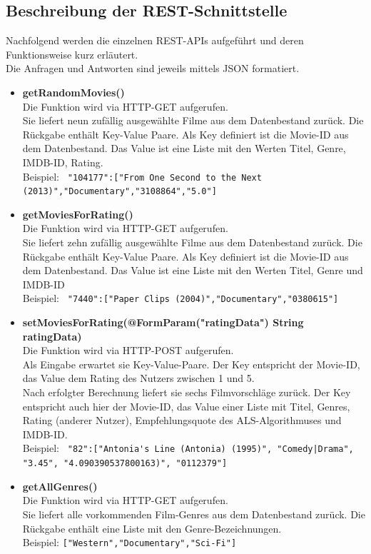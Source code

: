 \subsection{Beschreibung der REST-Schnittstelle}
Nachfolgend werden die einzelnen REST-APIs aufgeführt und deren Funktionsweise kurz erläutert.\\
Die Anfragen und Antworten sind jeweils mittels JSON formatiert.
\begin{itemize}
  \item \textbf{getRandomMovies()}\\
  	Die Funktion wird via HTTP-GET aufgerufen.\\
  	Sie liefert neun zufällig ausgewählte Filme aus dem Datenbestand zurück. Die Rückgabe enthält Key-Value Paare. Als Key definiert ist die Movie-ID aus dem Datenbestand. Das Value ist eine Liste mit den Werten Titel, Genre, IMDB-ID, Rating.\\
  	Beispiel: \lstinline{ "104177":["From One Second to the Next (2013)","Documentary","3108864","5.0"]}\\
  \item \textbf{getMoviesForRating()}\\
 	Die Funktion wird via HTTP-GET aufgerufen.\\
	Sie liefert zehn zufällig ausgewählte Filme aus dem Datenbestand zurück. Die Rückgabe enthält Key-Value Paare. Als Key definiert ist die Movie-ID aus dem Datenbestand. Das Value ist eine Liste mit den Werten Titel, Genre und IMDB-ID\\
  	Beispiel: \lstinline{ "7440":["Paper Clips (2004)","Documentary","0380615"]}\\
  \item \textbf{setMoviesForRating(@FormParam("ratingData") String ratingData)}\\
  	Die Funktion wird via HTTP-POST aufgerufen.\\
  	Als Eingabe erwartet sie Key-Value-Paare. Der Key entspricht der Movie-ID, das Value dem Rating des Nutzers zwischen 1 und 5.\\
  	Nach erfolgter Berechnung liefert sie sechs Filmvorschläge zurück. Der Key entspricht auch hier der Movie-ID, das Value einer Liste mit Titel, Genres, Rating (anderer Nutzer), Empfehlungsquote des ALS-Algorithmuses und IMDB-ID.\\
  	Beispiel: \lstinline{ "82":["Antonia's Line (Antonia) (1995)", "Comedy|Drama", "3.45", "4.090390537800163)", "0112379"]}\\
  \item \textbf{getAllGenres()}\\
  	Die Funktion wird via HTTP-GET aufgerufen.\\
  	Sie liefert alle vorkommenden Film-Genres aus dem Datenbestand zurück. Die Rückgabe enthält eine Liste mit den Genre-Bezeichnungen.\\
  	Beispiel: \lstinline{["Western","Documentary","Sci-Fi"]}\\


\end{itemize}
